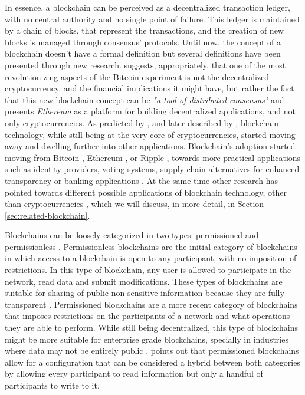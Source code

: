 In essence, a blockchain can be perceived as a decentralized transaction ledger, with no central authority and no single point of failure. This ledger is maintained by a chain of blocks, that represent the transactions, and the creation of new blocks is managed through consensus' protocols. Until now, the concept of a blockchain doesn't have a formal definition but several definitions have been presented through new research. \citeauthor{buterin_next-generation_2013} \cite{buterin_next-generation_2013} suggests, appropriately, that one of the most revolutionizing aspects of the Bitcoin experiment is not the decentralized cryptocurrency, and the financial implications it might have, but rather the fact that this new blockchain concept can be \textit{"a tool of distributed consensus"} \cite{buterin_next-generation_2013} and presents \textit{Ethereum} as a platform for building decentralized applications, and not only cryptocurrencies. As predicted by \citeauthor{buterin_next-generation_2013} \cite{buterin_next-generation_2013}, and later described by \citeauthor{pilkington_blockchain_2016} \cite{pilkington_blockchain_2016}, blockchain technology, while still being at the very core of cryptocurrencies, started moving away and dwelling further into other applications. Blockchain's adoption started moving from Bitcoin \cite{nakamoto_bitcoin:_2008}, Ethereum \cite{buterin_next-generation_2013}, or Ripple \cite{schwartz_ripple_2014}, towards more practical applications such as identity providers, voting systems, supply chain alternatives for enhanced transparency or banking applications \cite{pilkington_blockchain_2016}. At the same time other research has pointed towards different possible applications of blockchain technology, other than cryptocurrencies \cite{crosby_blockchain_2016, underwood_blockchain_2016, yermack_corporate_2017, xu_blockchain_2016}, which we will discuss, in more detail, in Section \ref{sec:related-blockchain}.

Blockchains can be loosely categorized in two types: permissioned and permissionless \cite{pilkington_blockchain_2016, yaga_blockchain_2018}. Permissionless blockchains are the initial category of blockchains in which access to a blockchain is open to any participant, with no imposition of restrictions. In this type of blockchain, any user is allowed to participate in the network, read data and submit modifications. These types of blockchains are suitable for sharing of public non-sensitive information because they are fully transparent \cite{yaga_blockchain_2018}. Permissioned blockchains are a more recent category of blockchains that imposes restrictions on the participants of a network and what operations they are able to perform. While still being decentralized, this type of blockchains might be more suitable for enterprise grade blockchains, specially in industries where data may not be entirely public \cite{yaga_blockchain_2018}. \citeauthor{pilkington_blockchain_2016} \cite{pilkington_blockchain_2016} points out that permissioned blockchains allow for a configuration that can be considered a hybrid between both categories by allowing every participant to read information but only a handful of participants to write to it.

